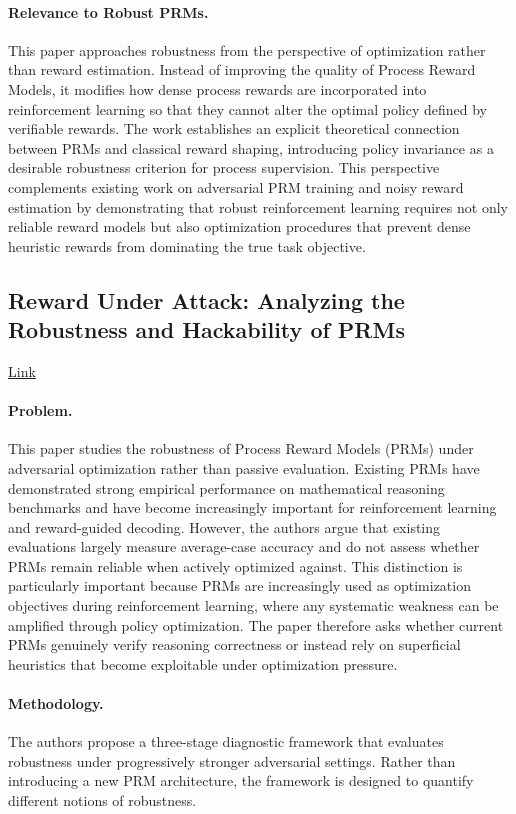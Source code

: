 \documentclass[11pt]{article}
\begin{document}
\paragraph{Relevance to Robust PRMs.}
This paper approaches robustness from the perspective of optimization rather than reward estimation. Instead of improving the quality of Process Reward Models, it modifies how dense process rewards are incorporated into reinforcement learning so that they cannot alter the optimal policy defined by verifiable rewards. The work establishes an explicit theoretical connection between PRMs and classical reward shaping, introducing policy invariance as a desirable robustness criterion for process supervision. This perspective complements existing work on adversarial PRM training and noisy reward estimation by demonstrating that robust reinforcement learning requires not only reliable reward models but also optimization procedures that prevent dense heuristic rewards from dominating the true task objective.

\subsection{Reward Under Attack: Analyzing the Robustness and Hackability of PRMs}

\href{https://arxiv.org/abs/2603.06621}{Link}
\paragraph{Problem.}
This paper studies the robustness of Process Reward Models (PRMs) under adversarial optimization rather than passive evaluation. Existing PRMs have demonstrated strong empirical performance on mathematical reasoning benchmarks and have become increasingly important for reinforcement learning and reward-guided decoding. However, the authors argue that existing evaluations largely measure average-case accuracy and do not assess whether PRMs remain reliable when actively optimized against. This distinction is particularly important because PRMs are increasingly used as optimization objectives during reinforcement learning, where any systematic weakness can be amplified through policy optimization. The paper therefore asks whether current PRMs genuinely verify reasoning correctness or instead rely on superficial heuristics that become exploitable under optimization pressure.

\paragraph{Methodology.}
The authors propose a three-stage diagnostic framework that evaluates robustness under progressively stronger adversarial settings. Rather than introducing a new PRM architecture, the framework is designed to quantify different notions of robustness.
\end{document}

